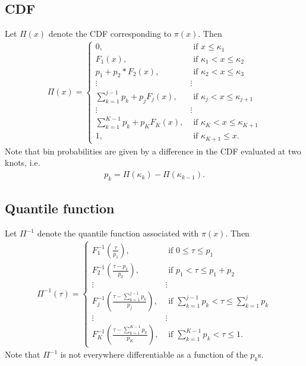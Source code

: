 \documentclass[12pt]{article}
\begin{document}
\subsection{CDF}
Let $\Pi(x)$ denote the CDF corresponding to $\pi(x)$. Then
\begin{align*}
  \Pi(x) = \begin{cases}
    0, & \mbox{ if } x \leq \kappa_1\\
    F_1(x), & \mbox{ if } \kappa_1 < x \leq \kappa_2\\
    p_1 + p_2*F_2(x), & \mbox{ if } \kappa_2 < x \leq \kappa_3 \\
  \vdots  & \vdots  \\
    \sum_{k=1}^{j-1}p_k + p_jF_j(x), &\mbox{ if } \kappa_j < x \leq \kappa_{j+1}\\
   \vdots & \vdots  \\
    \sum_{k=1}^{K-1}p_k + p_KF_K(x), &\mbox{ if } \kappa_{K} < x  \leq \kappa_{K+1} \\
    1, & \mbox{ if } \kappa_{K+1} \leq x.
  \end{cases}
\end{align*}
Note that bin probabilities are given by a difference in the CDF evaluated at two knots, i.e.
\begin{align*}
p_k = \Pi(\kappa_k) - \Pi(\kappa_{k-1}).
\end{align*}
\subsection{Quantile function}
Let $\Pi^{-1}$ denote the quantile function associated with $\pi(x)$. Then
\begin{align*}
  \Pi^{-1}(\tau) = \begin{cases}
    F^{-1}_1\left(\frac{\tau}{p_1}\right), & \mbox{ if } 0 \leq \tau \leq p_1 \\
    F^{-1}_2\left(\frac{\tau - p_1}{p_2}\right), & \mbox{ if } p_1 < \tau \leq p_1 + p_2 \\
  \vdots  & \vdots \\
    F^{-1}_j\left(\frac{\tau - \sum_{k=1}^{j-1}p_k}{p_j}\right), & \mbox{ if } \sum_{k=1}^{j-1}p_{k} < \tau \leq \sum_{k=1}^jp_{k} \\
  \vdots  & \vdots \\
    F^{-1}_K\left(\frac{\tau - \sum_{k=1}^{K-1}p_k}{p_K}\right), & \mbox{ if } \sum_{k=1}^{K-1}p_{k} < \tau \leq 1.
  \end{cases}
\end{align*}
Note that $\Pi^{-1}$ is not everywhere differentiable as a function of the $p_k$s.
\end{document}
